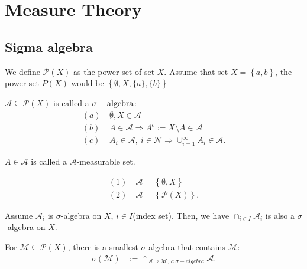 \documentclass[../../note.tex]{subfiles}
\begin{document}
\chapter{Measure Theory}
\section{Sigma algebra}
\begin{example}
    We define $\mathcal{P}(X)$ as the power set of set $X$. Assume that set $X = \left\{a,b\right\}$, the power set $P(X)$ would be $\left\{\emptyset, X, \{a\}, \{b\}\right\}$
\end{example}
\begin{definition}
    $\mathcal{A} \subseteq \mathcal{P}(X)$ is called a $\sigma-{\rm algebra}$:
    \begin{align}
        (a)~& \emptyset, X \in \mathcal{A} \\
        (b)~& A \in \mathcal{A} \Longrightarrow A^c:= X \text{\textbackslash} A \in \mathcal{A} \\
        (c)~& A_i \in \mathcal{A},~i \in \mathcal{N}\Longrightarrow \cup_{i=1}^{\infty} A_i \in \mathcal{A}.
    \end{align}
\end{definition}

\begin{definition}
    $A \in \mathcal{A}$ is called a $\mathcal{A}$-measurable set.
\end{definition}

\begin{example}
    \begin{align}
        (1)~&\mathcal{A} = \left\{\emptyset, X \right\} \\
        (2)~&\mathcal{A} = \left\{\mathcal{P}(X)\right\}.
    \end{align}
\end{example}

\begin{lemma}
    Assume $\mathcal{A}_i$ is $\sigma$-algebra on $X$, $i\in I$(index set). Then, we have $\cap_{i \in I} \mathcal{A}_i$ is also a $\sigma$-algebra on $X$.
\end{lemma}

\begin{definition}
    For $\mathcal{M} \subseteq \mathcal{P}(X)$, there is a smallest $\sigma$-algebra that contains $\mathcal{M}$:
    \begin{align}
        \sigma(\mathcal{M})
        &:= \cap_{\mathcal{A}\supseteq \mathcal{M},~a~\sigma-algebra} \mathcal{A}.
    \end{align}
\end{definition}
\end{document}
